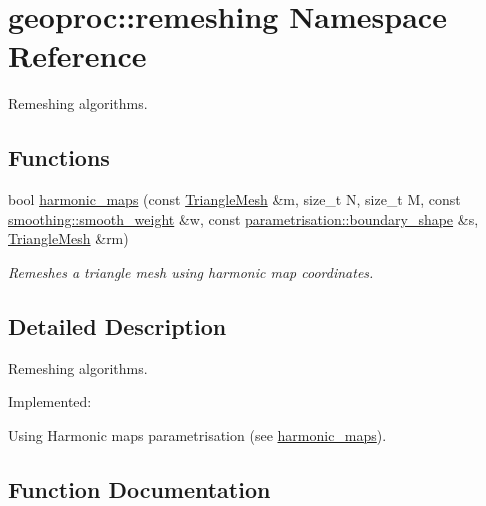 \hypertarget{namespacegeoproc_1_1remeshing}{}\section{geoproc\+:\+:remeshing Namespace Reference}
\label{namespacegeoproc_1_1remeshing}


Remeshing algorithms.  


\subsection*{Functions}
\begin{DoxyCompactItemize}
\item 
bool \hyperlink{namespacegeoproc_1_1remeshing_aaee6fb40eac4d9d9426e4f0f5d15d28c}{harmonic\+\_\+maps} (const \hyperlink{classgeoproc_1_1TriangleMesh}{Triangle\+Mesh} \&m, size\+\_\+t N, size\+\_\+t M, const \hyperlink{namespacegeoproc_1_1smoothing_a76e43f405426c150569712512de58028}{smoothing\+::smooth\+\_\+weight} \&w, const \hyperlink{namespacegeoproc_1_1parametrisation_a7f001bf497830114e8aea2c884a948b7}{parametrisation\+::boundary\+\_\+shape} \&s, \hyperlink{classgeoproc_1_1TriangleMesh}{Triangle\+Mesh} \&rm)
\begin{DoxyCompactList}\small\item\em Remeshes a triangle mesh using harmonic map coordinates. \end{DoxyCompactList}\end{DoxyCompactItemize}


\subsection{Detailed Description}
Remeshing algorithms. 

Implemented\+:
\begin{DoxyItemize}
\item Using Harmonic maps\textquotesingle{} parametrisation (see \hyperlink{namespacegeoproc_1_1remeshing_aaee6fb40eac4d9d9426e4f0f5d15d28c}{harmonic\+\_\+maps}). 
\end{DoxyItemize}

\subsection{Function Documentation}
\mbox{\label{namespacegeoproc_1_1remeshing_aaee6fb40eac4d9d9426e4f0f5d15d28c}} 
